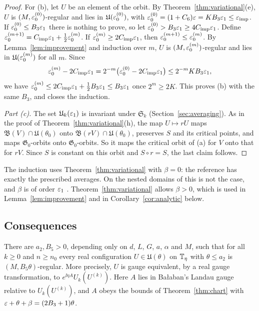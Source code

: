 \begin{proof}
For (b), let $U$ be an element of the orbit. By Theorem~\ref{thm:variational}(e), $U$ is $(M,\varepsilon_0^{(0)})$-regular and lies in $\mathfrak U(\varepsilon_0^{(0)})$, with $\varepsilon_0^{(0)}=(1+C_6)\varepsilon=KB_3\varepsilon_1\le\varepsilon_{\rm imp}$. If $\varepsilon_0^{(0)}\le B_3\varepsilon_1$ there is nothing to prove, so let $\varepsilon_0^{(0)}>B_3\varepsilon_1\ge4C_{\rm imp}\varepsilon_1$. Define $\varepsilon_0^{(m+1)}=C_{\rm imp}\varepsilon_1+\frac12\varepsilon_0^{(m)}$. If $\varepsilon_0^{(m)}\ge2C_{\rm imp}\varepsilon_1$, then $\varepsilon_0^{(m+1)}\le\varepsilon_0^{(m)}$. By Lemma~\ref{lem:improvement} and induction over $m$, $U$ is $(M,\varepsilon_0^{(m)})$-regular and lies in $\mathfrak U(\varepsilon_0^{(m)})$ for all $m$. Since
\[
\varepsilon_0^{(m)}-2C_{\rm imp}\varepsilon_1=2^{-m}\big(\varepsilon_0^{(0)}-2C_{\rm imp}\varepsilon_1\big)\le2^{-m}KB_3\varepsilon_1 ,
\]
we have $\varepsilon_0^{(m)}\le2C_{\rm imp}\varepsilon_1+\frac12B_3\varepsilon_1\le B_3\varepsilon_1$ once $2^{m}\ge2K$. This proves (b) with the same $B_3$, and closes the induction.

\emph{Part (c).} The set $\mathfrak U_k(\varepsilon_1)$ is invariant under $\mathfrak S_k$ (Section~\ref{sec:averaging}). As in the proof of Theorem~\ref{thm:variational}(h), the map $U\mapsto rU$ maps $\mathfrak B(V)\cap\mathfrak U(\theta_0)$ onto $\mathfrak B(rV)\cap\mathfrak U(\theta_0)$, preserves $S$ and its critical points, and maps $\mathfrak G_0$-orbits onto $\mathfrak G_0$-orbits. So it maps the critical orbit of (a) for $V$ onto that for $rV$. Since $S$ is constant on this orbit and $S\circ r=S$, the last claim follows.
\end{proof}

The induction uses Theorem~\ref{thm:variational} with $\beta=0$: the reference has exactly the prescribed averages. On the nested domains of \cite{BalVar} this is not the case, and $\beta$ is of order $\varepsilon_1$ \cite[(14)]{BalVar}. Theorem~\ref{thm:variational} allows $\beta>0$, which is used in Lemma~\ref{lem:improvement} and in Corollary~\ref{cor:analytic} below.

\subsection{Consequences}\label{ss:30.4}

\begin{corollary}\label{cor:regularity}
There are $a_2,B_5>0$, depending only on $d$, $L$, $G$, $a$, $\alpha$ and $M$, such that for all $k\ge0$ and $n\ge n_0$ every real configuration $U\in\mathfrak U(\theta)$ on $\mathbb T_\eta$ with $\theta\le a_2$ is $(M,B_5\theta)$-regular. More precisely, $U$ is gauge equivalent, by a real gauge transformation, to $e^{\ii\eta A}U_k(U^{(k)})$. Here $A$ lies in Ba\l aban's Landau gauge relative to $U_k(U^{(k)})$, and $A$ obeys the bounds of Theorem~\ref{thm:chart} with $\varepsilon+\theta+\beta=(2B_3+1)\theta$.
\end{corollary}

